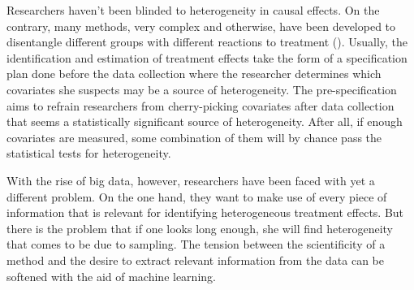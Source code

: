 Researchers haven't been blinded to heterogeneity in causal effects. On the contrary, many methods, very complex and otherwise, have been developed to disentangle different groups with different reactions to treatment (\cite{imbensIdentificationEstimationLocal1994}). Usually, the identification and estimation of treatment effects take the form of a specification plan done before the data collection where the researcher determines which covariates she suspects may be a source of heterogeneity. The pre-specification aims to refrain researchers from cherry-picking covariates after data collection that seems a statistically significant source of heterogeneity. After all, if enough covariates are measured, some combination of them will by chance pass the statistical tests for heterogeneity.

With the rise of big data, however, researchers have been faced with yet a different problem. On the one hand, they want to make use of every piece of information that is relevant for identifying heterogeneous treatment effects. But there is the problem that if one looks long enough, she will find heterogeneity that comes to be due to sampling. The tension between the scientificity of a method and the desire to extract relevant information from the data can be softened with the aid of machine learning.

\newpage

